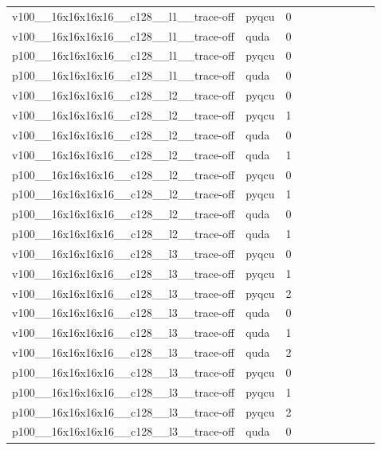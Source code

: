 \begin{table}[htbp]
\begin{tabular}{@{}llrrrrrrrr@{}}
v100\_\_16x16x16x16\_\_c128\_\_l1\_\_trace-off & pyqcu & 0 &  &  &  &  &  &  &  \\
v100\_\_16x16x16x16\_\_c128\_\_l1\_\_trace-off & quda & 0 &  &  &  &  &  &  &  \\
p100\_\_16x16x16x16\_\_c128\_\_l1\_\_trace-off & pyqcu & 0 &  &  &  &  &  &  &  \\
p100\_\_16x16x16x16\_\_c128\_\_l1\_\_trace-off & quda & 0 &  &  &  &  &  &  &  \\
v100\_\_16x16x16x16\_\_c128\_\_l2\_\_trace-off & pyqcu & 0 &  &  &  &  &  &  &  \\
v100\_\_16x16x16x16\_\_c128\_\_l2\_\_trace-off & pyqcu & 1 &  &  &  &  &  &  &  \\
v100\_\_16x16x16x16\_\_c128\_\_l2\_\_trace-off & quda & 0 &  &  &  &  &  &  &  \\
v100\_\_16x16x16x16\_\_c128\_\_l2\_\_trace-off & quda & 1 &  &  &  &  &  &  &  \\
p100\_\_16x16x16x16\_\_c128\_\_l2\_\_trace-off & pyqcu & 0 &  &  &  &  &  &  &  \\
p100\_\_16x16x16x16\_\_c128\_\_l2\_\_trace-off & pyqcu & 1 &  &  &  &  &  &  &  \\
p100\_\_16x16x16x16\_\_c128\_\_l2\_\_trace-off & quda & 0 &  &  &  &  &  &  &  \\
p100\_\_16x16x16x16\_\_c128\_\_l2\_\_trace-off & quda & 1 &  &  &  &  &  &  &  \\
v100\_\_16x16x16x16\_\_c128\_\_l3\_\_trace-off & pyqcu & 0 &  &  &  &  &  &  &  \\
v100\_\_16x16x16x16\_\_c128\_\_l3\_\_trace-off & pyqcu & 1 &  &  &  &  &  &  &  \\
v100\_\_16x16x16x16\_\_c128\_\_l3\_\_trace-off & pyqcu & 2 &  &  &  &  &  &  &  \\
v100\_\_16x16x16x16\_\_c128\_\_l3\_\_trace-off & quda & 0 &  &  &  &  &  &  &  \\
v100\_\_16x16x16x16\_\_c128\_\_l3\_\_trace-off & quda & 1 &  &  &  &  &  &  &  \\
v100\_\_16x16x16x16\_\_c128\_\_l3\_\_trace-off & quda & 2 &  &  &  &  &  &  &  \\
p100\_\_16x16x16x16\_\_c128\_\_l3\_\_trace-off & pyqcu & 0 &  &  &  &  &  &  &  \\
p100\_\_16x16x16x16\_\_c128\_\_l3\_\_trace-off & pyqcu & 1 &  &  &  &  &  &  &  \\
p100\_\_16x16x16x16\_\_c128\_\_l3\_\_trace-off & pyqcu & 2 &  &  &  &  &  &  &  \\
p100\_\_16x16x16x16\_\_c128\_\_l3\_\_trace-off & quda & 0 &  &  &  &  &  &  &  \\

\end{tabular}
\end{table}

